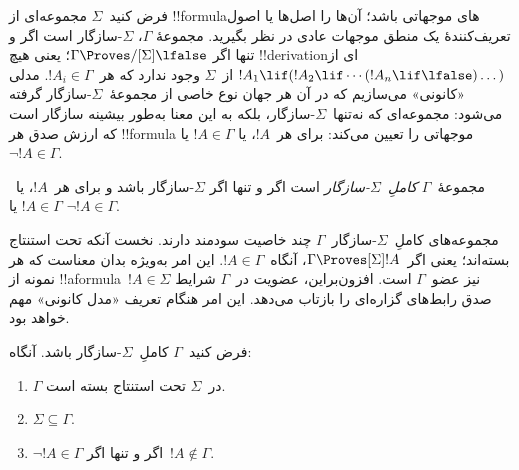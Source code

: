 \documentclass[../../../include/open-logic-section]{subfiles}
\begin{document}


فرض کنید~$\Sigma$ مجموعه‌ای از !!{formula}های موجهاتی باشد؛ آن‌ها را
اصل‌ها یا اصول تعریف‌کنندهٔ یک منطق موجهات عادی در نظر بگیرید. مجموعهٔ
$\Gamma$، $\Sigma$-سازگار است اگر و تنها اگر
$\Gamma \Proves/[\Sigma] \lfalse$؛ یعنی هیچ !!{derivation}ای از
$!A_1 \lif (!A_2 \lif \cdots (!A_n \lif \lfalse)\dots)$ از~$\Sigma$
وجود ندارد که هر~$!A_i \in \Gamma$. مدلی «کانونی» می‌سازیم که در آن
هر جهان نوع خاصی از مجموعهٔ~$\Sigma$-سازگار گرفته می‌شود: مجموعه‌ای که
نه‌تنها~$\Sigma$-سازگار، بلکه به این معنا به‌طور بیشینه سازگار است که
ارزش صدق هر !!{formula} موجهاتی را تعیین می‌کند: برای هر~$!A$، یا
$!A \in \Gamma$ یا~$\lnot !A \in \Gamma$.

\begin{defn}
  مجموعهٔ~$\Gamma$ \emph{کاملِ~$\Sigma$-سازگار} است اگر و تنها اگر
  $\Sigma$-سازگار باشد و برای هر~$!A$، یا~$!A \in \Gamma$ یا
  $\lnot !A \in \Gamma$.
\end{defn}

مجموعه‌های کاملِ~$\Sigma$-سازگار~$\Gamma$ چند خاصیت سودمند دارند. نخست
آنکه تحت استنتاج بسته‌اند؛ یعنی اگر~$\Gamma \Proves[\Sigma] !A$،
آنگاه~$!A \in \Gamma$. این امر به‌ویژه بدان معناست که هر نمونه از
!!a{formula}~$!A \in \Sigma$ نیز عضو~$\Gamma$ است. افزون‌براین، عضویت
در~$\Gamma$ شرایط صدق رابط‌های گزاره‌ای را بازتاب می‌دهد. این امر هنگام
تعریف «مدل کانونی» مهم خواهد بود.

\begin{prop}
  فرض کنید~$\Gamma$ کاملِ~$\Sigma$-سازگار باشد. آنگاه:
  \begin{enumerate}
  \item {}%
    $\Gamma$ در~$\Sigma$ تحت استنتاج بسته است.
  \item {}%
    $\Sigma \subseteq \Gamma$.
  \item {}%
    $\lnot!A \in \Gamma$ اگر و تنها اگر~$!A \notin \Gamma$.
  \end{enumerate}
\end{prop}
\end{document}
